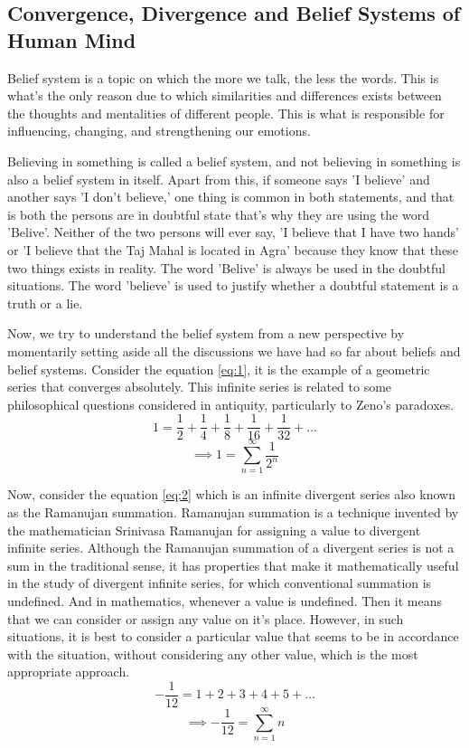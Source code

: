\subsection{Convergence, Divergence and Belief Systems of Human Mind}
Belief system is a topic on which the more we talk, the less the words. This is what's the only reason due to which similarities and differences exists between the thoughts and mentalities of different people. This is what is responsible for influencing, changing, and strengthening our emotions.

Believing in something is called a belief system, and not believing in something is also a belief system in itself. Apart from this, if someone says 'I believe' and another says 'I don't believe,' one thing is common in both statements, and that is both the persons are in doubtful state that's why they are using the word 'Belive'. Neither of the two persons will ever say, 'I believe that I have two hands' or 'I believe that the Taj Mahal is located in Agra' because they know that these two things exists in reality. The word 'Belive' is always be used in the doubtful situations. The word 'believe' is used to justify whether a doubtful statement is a truth or a lie.

Now, we try to understand the belief system from a new perspective by momentarily setting aside all the discussions we have had so far about beliefs and belief systems. Consider the equation \ref{eq:1}, it is the example of a geometric series that converges absolutely. This infinite series is related to some philosophical questions considered in antiquity, particularly to Zeno's paradoxes\cite{enwiki:1123380424}.
\[1 = \dfrac{1}{2} + \dfrac{1}{4} + \dfrac{1}{8} + \dfrac{1}{16} + \dfrac{1}{32} + ...\]
\begin{equation}\label{eq:1}
	\implies\boxed{1 = \sum\limits_{n = 1}^\infty\dfrac{1}{2^n}}
\end{equation}

Now, consider the equation \ref{eq:2} which is an infinite divergent series also known as the Ramanujan summation. Ramanujan summation is a technique invented by the mathematician Srinivasa Ramanujan for assigning a value to divergent infinite series. Although the Ramanujan summation of a divergent series is not a sum in the traditional sense, it has properties that make it mathematically useful in the study of divergent infinite series, for which conventional summation is undefined\cite{enwiki:1148245424}. And in mathematics, whenever a value is undefined. Then it means that we can consider or assign any value on it's place. However, in such situations, it is best to consider a particular value that seems to be in accordance with the situation, without considering any other value, which is the most appropriate approach.
\[-\dfrac{1}{12} = 1 + 2 + 3 + 4 + 5 + ...\]
\begin{equation}\label{eq:2}
	\implies\boxed{-\dfrac{1}{12} = \sum\limits_{n = 1}^\infty n}
\end{equation}


